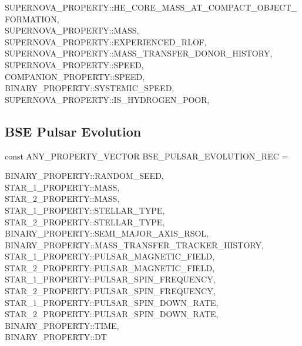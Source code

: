 \begin{minipage}{\dimexpr\textwidth-2em}
    SUPERNOVA\_PROPERTY::HE\_CORE\_MASS\_AT\_COMPACT\_OBJECT\_FORMATION, \\
    SUPERNOVA\_PROPERTY::MASS, \\
    SUPERNOVA\_PROPERTY::EXPERIENCED\_RLOF, \\
    SUPERNOVA\_PROPERTY::MASS\_TRANSFER\_DONOR\_HISTORY, \\
    SUPERNOVA\_PROPERTY::SPEED, \\
    COMPANION\_PROPERTY::SPEED, \\
    BINARY\_PROPERTY::SYSTEMIC\_SPEED, \\
    SUPERNOVA\_PROPERTY::IS\_HYDROGEN\_POOR, \\
\end{minipage}
\par\rcb{;}

\newpage
\subsection{BSE Pulsar Evolution}\label{sec:BSEPulsarEvolution}

const ANY\_PROPERTY\_VECTOR BSE\_PULSAR\_EVOLUTION\_REC = \lcb

\hfill
\begin{minipage}{\dimexpr\textwidth-2em}
    BINARY\_PROPERTY::RANDOM\_SEED, \\
    STAR\_1\_PROPERTY::MASS, \\
    STAR\_2\_PROPERTY::MASS, \\
    STAR\_1\_PROPERTY::STELLAR\_TYPE, \\
    STAR\_2\_PROPERTY::STELLAR\_TYPE, \\
    BINARY\_PROPERTY::SEMI\_MAJOR\_AXIS\_RSOL, \\
    BINARY\_PROPERTY::MASS\_TRANSFER\_TRACKER\_HISTORY, \\
    STAR\_1\_PROPERTY::PULSAR\_MAGNETIC\_FIELD, \\
    STAR\_2\_PROPERTY::PULSAR\_MAGNETIC\_FIELD, \\
    STAR\_1\_PROPERTY::PULSAR\_SPIN\_FREQUENCY, \\
    STAR\_2\_PROPERTY::PULSAR\_SPIN\_FREQUENCY, \\
    STAR\_1\_PROPERTY::PULSAR\_SPIN\_DOWN\_RATE, \\
    STAR\_2\_PROPERTY::PULSAR\_SPIN\_DOWN\_RATE, \\
    BINARY\_PROPERTY::TIME, \\
    BINARY\_PROPERTY::DT
\end{minipage}
\par\rcb{;}

